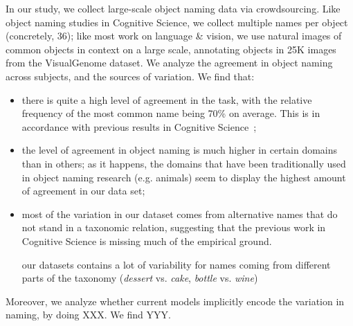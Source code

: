 In our study, we collect large-scale object naming data via crowdsourcing.
Like object naming studies in Cognitive Science, we collect multiple names per object (concretely, 36); like most work on language \& vision, we use natural images of common objects in context 
on a large scale, annotating objects in 25K images from the VisualGenome dataset.
We analyze the agreement in object naming across subjects, and the sources of variation. We find that: 

\begin{itemize}
\item there is quite a high level of agreement in the task, with the relative frequency of the most common name being 70\% on average. This is in accordance with previous results in Cognitive Science~\cite{add-ref};
\item the level of agreement in object naming is much higher in certain domains than in others; as it happens, the domains that have been traditionally used in object naming research (e.g. animals) seem to display the highest amount of agreement in our data set;
\item most of the variation in our dataset comes from alternative names that do not stand in a taxonomic relation, suggesting that the previous work in Cognitive Science is missing much of the empirical ground.

our datasets contains a lot of variability for names coming from different parts of the taxonomy (\emph{dessert} vs. \emph{cake}, \emph{bottle} vs. \emph{wine})
\end{itemize}

Moreover, we analyze whether current models implicitly encode the variation in naming, by doing XXX. We find YYY.




